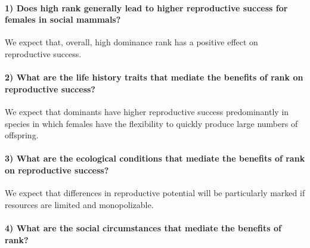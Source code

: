 \documentclass[]{article}
\let\oldparagraph\paragraph
\renewcommand{\paragraph}[1]{\oldparagraph{#1}\mbox{}}
\begin{document}
\hypertarget{does-high-rank-generally-lead-to-higher-reproductive-success-for-females-in-social-mammals}{%
\paragraph{\texorpdfstring{\textbf{1) Does high rank generally lead to
higher reproductive success for females in social
mammals?}}{1) Does high rank generally lead to higher reproductive success for females in social mammals?}}\label{does-high-rank-generally-lead-to-higher-reproductive-success-for-females-in-social-mammals}}

We expect that, overall, high dominance rank has a positive effect on
reproductive success.

\hypertarget{what-are-the-life-history-traits-that-mediate-the-benefits-of-rank-on-reproductive-success}{%
\paragraph{\texorpdfstring{\textbf{2) What are the life history traits
that mediate the benefits of rank on reproductive
success?}}{2) What are the life history traits that mediate the benefits of rank on reproductive success?}}\label{what-are-the-life-history-traits-that-mediate-the-benefits-of-rank-on-reproductive-success}}

We expect that dominants have higher reproductive success predominantly
in species in which females have the flexibility to quickly produce
large numbers of offspring.

\hypertarget{what-are-the-ecological-conditions-that-mediate-the-benefits-of-rank-on-reproductive-success}{%
\paragraph{\texorpdfstring{\textbf{3) What are the ecological conditions
that mediate the benefits of rank on reproductive
success?}}{3) What are the ecological conditions that mediate the benefits of rank on reproductive success?}}\label{what-are-the-ecological-conditions-that-mediate-the-benefits-of-rank-on-reproductive-success}}

We expect that differences in reproductive potential will be
particularly marked if resources are limited and monopolizable.

\hypertarget{what-are-the-social-circumstances-that-mediate-the-benefits-of-rank}{%
\paragraph{\texorpdfstring{\textbf{4) What are the social circumstances
that mediate the benefits of
rank?}}{4) What are the social circumstances that mediate the benefits of rank?}}\label{what-are-the-social-circumstances-that-mediate-the-benefits-of-rank}}
\end{document}
